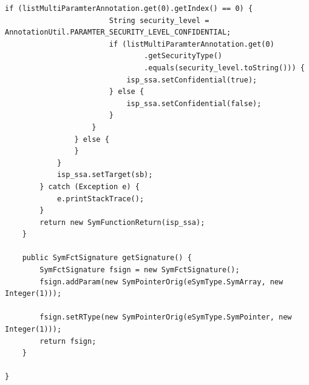 \begin{lstlisting}[caption={Function model of getenv()},label={lst:getenv()}]
					if (listMultiParamterAnnotation.get(0).getIndex() == 0) {
						String security_level = AnnotationUtil.PARAMTER_SECURITY_LEVEL_CONFIDENTIAL;
						if (listMultiParamterAnnotation.get(0)
								.getSecurityType()
								.equals(security_level.toString())) {
							isp_ssa.setConfidential(true);
						} else {
							isp_ssa.setConfidential(false);
						}
					}
				} else {
				}
			}
			isp_ssa.setTarget(sb);
		} catch (Exception e) {
			e.printStackTrace();
		}
		return new SymFunctionReturn(isp_ssa);
	}

	public SymFctSignature getSignature() {
		SymFctSignature fsign = new SymFctSignature();
		fsign.addParam(new SymPointerOrig(eSymType.SymArray, new Integer(1)));

		fsign.setRType(new SymPointerOrig(eSymType.SymPointer, new Integer(1)));
		return fsign;
	}

}
\end{lstlisting}

